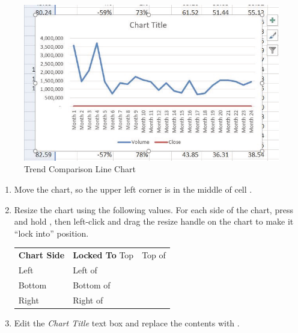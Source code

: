 \begin{figure}[H]
	\centering
	\includegraphics[width=\maxwidth{.95\linewidth}]{gfx/ch04_fig07}
	\caption{Trend Comparison Line Chart}
	\label{04:fig07}
\end{figure}

\begin{enumbox}
	\begin{enumerate}
		\item Move the chart, so the upper left corner is in the middle of cell .
		\item Resize the chart using the following values. For each side of the chart, press and hold , then left-click and drag the resize handle on the chart to make it ``lock into'' position.
		
		\begin{table}[H]
			\captionsetup{labelformat=empty} %
			{\small
				\begin{longtable}{R{0.75in}L{1.50in}} %
					\textbf{Chart Side} & \textbf{Locked To} \endhead
					\hline
					Top & Top of \\
					Left & Left of \\
					Bottom & Bottom of \\
					Right & Right of \\
				\end{longtable}
			} %
		\end{table}

		\item Edit the \textit{Chart Title} text box and replace the contents with .
	\end{enumerate}
\end{enumbox}


